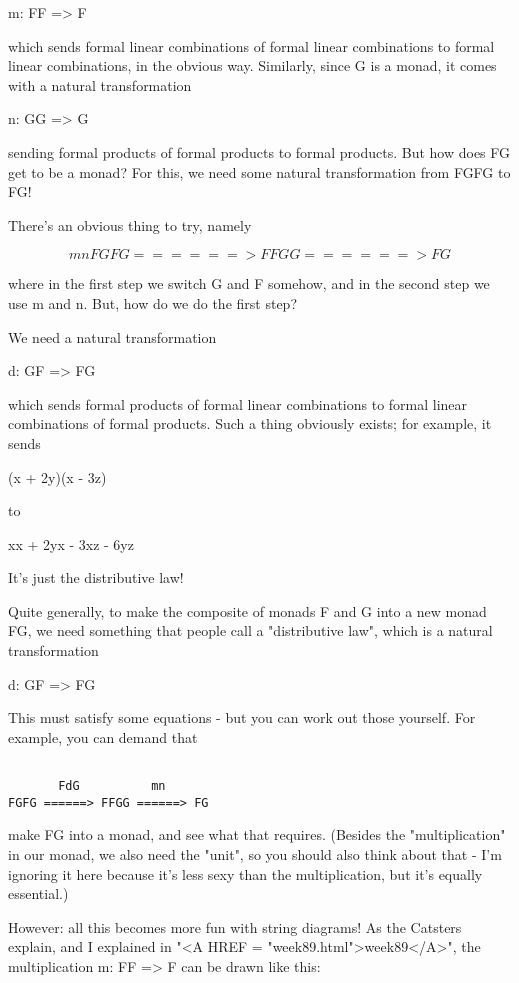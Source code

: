 m: FF => F

which sends formal linear combinations of formal linear combinations
to formal linear combinations, in the obvious way.  Similarly,
since G is a monad, it comes with a natural transformation

n: GG => G

sending formal products of formal products to formal products.
But how does FG get to be a monad?  For this, we need some 
natural transformation from FGFG to FG!

There's an obvious thing to try, namely


$$

                    mn 
FGFG ======> FFGG ======> FG
$$
    
where in the first step we switch G and F somehow, and in the
second step we use m and n.  But, how do we do the first step?

We need a natural transformation

d: GF => FG

which sends formal products of formal linear combinations
to formal linear combinations of formal products.  Such a
thing obviously exists; for example, it sends

(x + 2y)(x - 3z) 

to

xx + 2yx - 3xz - 6yz

It's just the distributive law!  

Quite generally, to make the composite of monads F and 
G into a new monad FG, we need something that people call a
"distributive law", which is a natural transformation

d: GF => FG

This must satisfy some equations - but you can work out
those yourself.  For example, you can demand that


\begin{verbatim}

       FdG          mn 
FGFG ======> FFGG ======> FG

\end{verbatim}
    

make FG into a monad, and see what that requires.  (Besides the
"multiplication" in our monad, we also need the
"unit", so you should also think about that - I'm ignoring
it here because it's less sexy than the multiplication, but it's
equally essential.)

However: all this becomes more fun with string diagrams!  As the
Catsters explain, and I explained in "<A HREF =
"week89.html">week89</A>", the multiplication m: FF => F can
be drawn like this:


